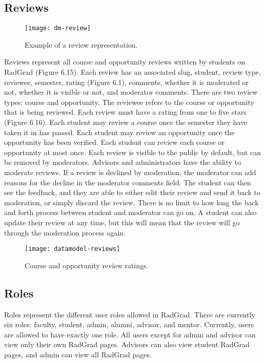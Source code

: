 \subsection{Reviews}
\begin{figure}[h]
\centering
\texttt{[image: dm-review]}
\caption{Example of a review representation.}
\end{figure}
Reviews represent all course and opportunity reviews written by students on RadGrad (Figure 6.15). Each review has an associated slug, student, review type, reviewee, semester, rating (Figure 6.1), comments, whether it is moderated or not, whether it is visible or not, and moderator comments. There are two review types: course and opportunity. The reviewee refers to the course or opportunity that is being reviewed. Each review must have a rating from one to five stars (Figure 6.16). Each student may review a course once the semester they have taken it in has passed. Each student may review an opportunity once the opportunity has been verified. Each student can review each course or opportunity at most once. Each review is visible to the public by default, but can be removed by moderators. Advisors and administrators have the ability to moderate reviews. If a review is declined by moderation, the moderator can add reasons for the decline in the moderator comments field. The student can then see the feedback, and they are able to either edit their review and send it back to moderation, or simply discard the review. There is no limit to how long the back and forth process between student and moderator can go on. A student can also update their review at any time, but this will mean that the review will go through the moderation process again.

\begin{figure}[h]
\centering
\texttt{[image: datamodel-reviews]}
\caption{Course and opportunity review ratings.}
\end{figure}

\subsection{Roles}
Roles represent the different user roles allowed in RadGrad. There are currently six roles: faculty, student, admin, alumni, advisor, and mentor. Currently, users are allowed to have exactly one role. All users except for admin and advisor can view only their own RadGrad pages. Advisors can also view student RadGrad pages, and admin can view all RadGrad pages. 

